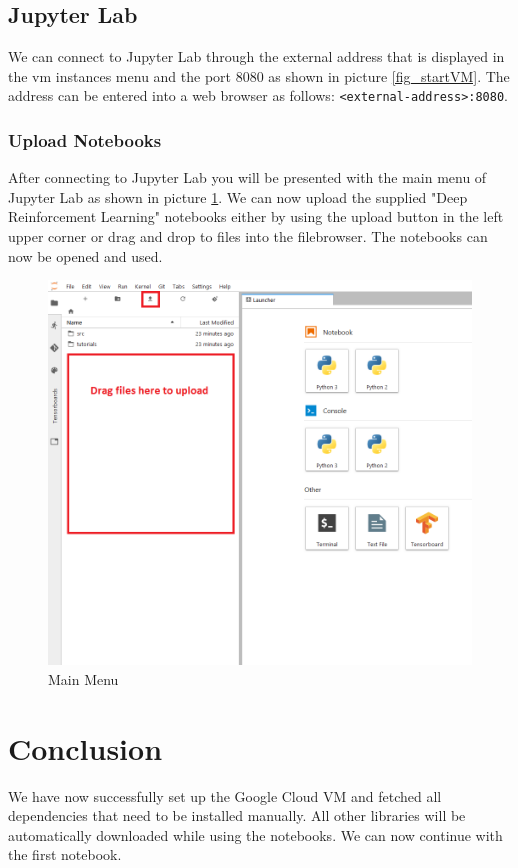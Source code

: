 \documentclass[a4paper]{article}
\begin{document}
\subsection{Jupyter Lab}
We can connect to Jupyter Lab through the external address that is displayed in the vm instances menu and the port 8080 as shown in picture \ref{fig_startVM}. The address can be entered into a web browser as follows: \lstinline|<external-address>:8080|.
\subsubsection{Upload Notebooks}
After connecting to Jupyter Lab you will be presented with the main menu of Jupyter Lab as shown in picture \ref{fig_mainMenu}. We can now upload the supplied "Deep Reinforcement Learning" notebooks either by using the upload button in the left upper corner or drag and drop to files into the filebrowser. The notebooks can now be opened and used.
\begin{figure}[H]
	\centerline{\includegraphics[width=\textwidth]{img/jupyterLab}}
	\caption{Main Menu}
	\label{fig_mainMenu}
\end{figure}
\section{Conclusion}
We have now successfully set up the Google Cloud VM and fetched all dependencies that need to be installed manually. All other libraries will be automatically downloaded while using the notebooks. We can now continue with the first notebook.

 

\end{document}
